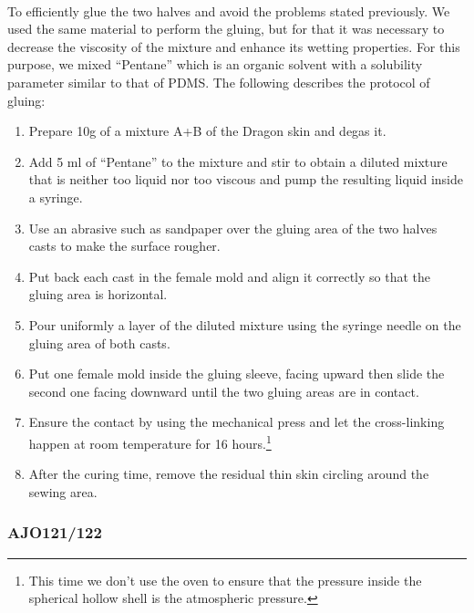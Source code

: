 \paragraph{} 
To efficiently glue the two halves and avoid the problems stated previously. We used the same material to perform the gluing, but for that it was necessary to decrease the viscosity of the mixture and enhance its wetting properties. For this purpose, we mixed "`Pentane"' which is an organic solvent \cite{NgLee2003} with a solubility parameter similar to that of PDMS.
The following describes the protocol of gluing:
\begin{enumerate}
	\item Prepare 10g of a mixture A+B of the Dragon skin and degas it.
	\item Add 5 ml of "`Pentane"' to the mixture and stir to obtain a diluted mixture that is neither too liquid nor too viscous and pump the resulting liquid inside a syringe.
	\item Use an abrasive such as sandpaper over the gluing area of the two halves casts to make the surface rougher.
	\item Put back each cast in the female mold and align it correctly so that the gluing area is horizontal.
	\item Pour uniformly a layer of the diluted mixture using the syringe needle on the gluing area of both casts.
	\item Put one female mold inside the gluing sleeve, facing upward then slide the second one facing downward until the two gluing areas are in contact.
	\item Ensure the contact by using the mechanical press and let the cross-linking happen at room temperature for 16 hours.\footnote{This time we don't use the oven to ensure that the pressure inside the spherical hollow shell is the atmospheric pressure.}
	\item After the curing time, remove the residual thin skin circling around the sewing area.
\end{enumerate}
  

\subsubsection{AJO121/122}
